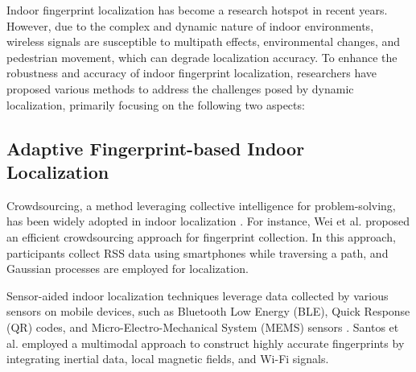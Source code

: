 %

Indoor fingerprint localization has become a research hotspot in recent years. However, due to the complex and dynamic nature of indoor environments, wireless signals are susceptible to multipath effects, environmental changes, and pedestrian movement, which can degrade localization accuracy. To enhance the robustness and accuracy of indoor fingerprint localization, researchers have proposed various methods to address the challenges posed by dynamic localization, primarily focusing on the following two aspects:

\subsection{Adaptive Fingerprint-based Indoor Localization}
Crowdsourcing, a method leveraging collective intelligence for problem-solving, has been widely adopted in indoor localization \cite{ji2022generating}. For instance, Wei et al. \cite{wei2021efficient} proposed an efficient crowdsourcing approach for fingerprint collection. In this approach, participants collect RSS data using smartphones while traversing a path, and Gaussian processes are employed for localization.

Sensor-aided indoor localization techniques leverage data collected by various sensors on mobile devices, such as Bluetooth Low Energy (BLE), Quick Response (QR) codes, and Micro-Electro-Mechanical System (MEMS) sensors \cite{yu2023intelligent}. Santos et al. \cite{santos2021crowdsourcing} employed a multimodal approach to construct highly accurate fingerprints by integrating inertial data, local magnetic fields, and Wi-Fi signals.

